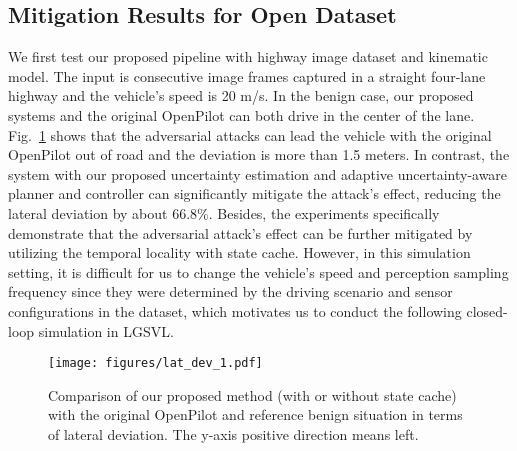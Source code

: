 \subsection{Mitigation Results for Open Dataset}
We first test our proposed pipeline with highway image dataset and kinematic model. The input is consecutive image frames captured in a straight four-lane highway and the vehicle's speed is 20 m/s. In the benign case, our proposed systems and the original OpenPilot can both drive in the center of the lane. Fig.~\ref{fig:lateral dev} shows that the adversarial attacks can lead the vehicle with the original OpenPilot out of road and the deviation is more than 1.5 meters. In contrast, the system with our proposed uncertainty estimation and adaptive uncertainty-aware planner and controller can significantly mitigate the attack's effect, reducing the lateral deviation by about $66.8\%$. Besides, the experiments specifically demonstrate that the adversarial attack's effect can be further mitigated by utilizing the temporal locality with state cache. However, in this simulation setting, it is difficult for us to change the vehicle's speed and perception sampling frequency since they were determined by the driving scenario and sensor configurations in the dataset, which motivates us to conduct the following closed-loop simulation in LGSVL.


\begin{figure}[htbp]
\centerline{\texttt{[image: figures/lat\_dev\_1.pdf]}}
\caption{Comparison of our proposed method (with or without state cache) with the original OpenPilot and reference benign situation in terms of lateral deviation. The y-axis positive direction means left. 
}
\label{fig:lateral dev}
\end{figure}




